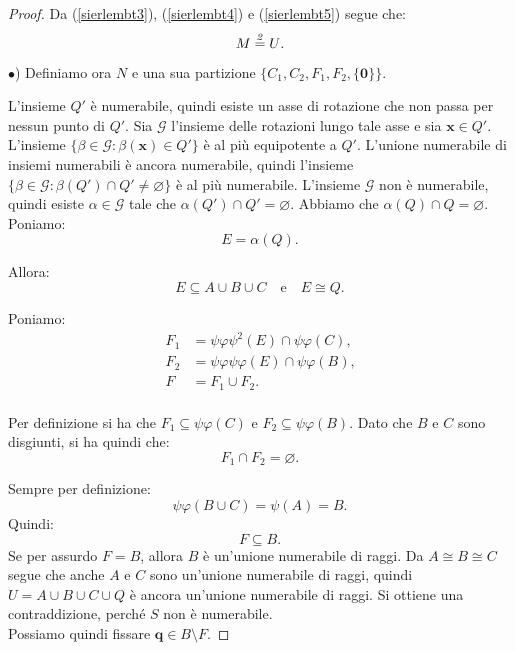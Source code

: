 \documentclass[a4paper,oneside,11pt]{book}
\theoremstyle{definition} \newtheorem{Def}{Definizione}
\theoremstyle{plain} \newtheorem{teo}{Teorema}
\theoremstyle{plain} \newtheorem{cor}[teo]{Corollario}
\theoremstyle{definition} \newtheorem{lem}[teo]{Lemma}
\theoremstyle{plain} \newtheorem{pro}[teo]{Proposizione}
\newcommand{\ug}[1]{(\ref{#1})} %
\newcommand{\eqn}[1]{\stackrel{\text{\textit{#1}}}{=}}
\begin{document}
\begin{proof}
		Da \ug{sierlembt3}, \ug{sierlembt4} e \ug{sierlembt5} segue che:
		\begin{equation*}
			M \eqn{2} U \text{.}
		\end{equation*}
		
		$\bullet$) Definiamo ora $N$ e una sua partizione $\{C_1, C_2, F_1, F_2, \{\mathbf{0}\}\}$.
		
		L'insieme $Q'$ è numerabile, quindi esiste un asse di rotazione che non passa per nessun punto di $Q'$. Sia $\mathcal{G}$ l'insieme delle rotazioni lungo tale asse e sia $\mathbf{x} \in Q'$. L'insieme $\{\beta \in \mathcal{G} : \beta(\mathbf{x}) \in Q'\}$ è al più equipotente a $Q'$. L'unione numerabile di insiemi numerabili è ancora numerabile, quindi l'insieme $\{\beta \in \mathcal{G} : \beta(Q') \cap Q' \neq \varnothing\}$ è al più numerabile. L'insieme $\mathcal{G}$ non è numerabile, quindi esiste $\alpha \in \mathcal{G}$ tale che $\alpha(Q') \cap Q' = \varnothing$. Abbiamo che $\alpha(Q) \cap Q = \varnothing$. Poniamo:
		\begin{equation*}
			E = \alpha(Q) \text{.} 
		\end{equation*}
		
		Allora:
		\begin{equation}\label{sierlembt6}
			E \subseteq A \cup B \cup C \quad \text{e} \quad E \cong Q \text{.} 
		\end{equation}
		
		Poniamo:
		\begin{equation*}
			\begin{aligned}
				F_1 &= \psi\varphi\psi^2(E) \cap \psi\varphi(C) \text{,} \\
				F_2 &= \psi\varphi\psi\varphi(E) \cap \psi\varphi(B) \text{,} \\
				F &= F_1 \cup F_2 \text{.} \\
			\end{aligned}
		\end{equation*}
		
		Per definizione si ha che $F_1 \subseteq \psi\varphi(C)$ e $F_2 \subseteq \psi\varphi(B)$. Dato che $B$ e $C$ sono disgiunti, si ha quindi che:
		\begin{equation}\label{sierlembt7}
			F_1 \cap F_2 = \varnothing \text{.} 
		\end{equation}
		
		Sempre per definizione:
		\begin{equation*}
			\psi\varphi(B \cup C) = \psi(A) = B \text{.} 
		\end{equation*}
		Quindi:
		\begin{equation*}
			F \subseteq B \text{.} 
		\end{equation*}
		Se per assurdo $F=B$, allora $B$ è un'unione numerabile di raggi. Da $A \cong B \cong C$ segue che anche $A$ e $C$ sono un'unione numerabile di raggi, quindi $U = A \cup B \cup C \cup Q$ è ancora un'unione numerabile di raggi. Si ottiene una contraddizione, perché $S$ non è numerabile. \lightning\\
		Possiamo quindi fissare $\mathbf{q} \in B \setminus F$.
		

\end{proof}
\end{document}
